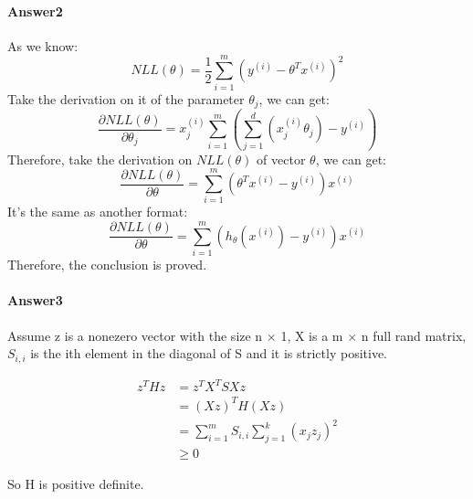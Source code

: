 \documentclass[paper=a4, fontsize=11pt]{scrartcl} %
\numberwithin{equation}{section} %
\numberwithin{figure}{section} %
\numberwithin{table}{section} %
\begin{document}
\paragraph{\textbf{Answer2}}
As we know:
\begin{equation*}
NLL\left ( \theta  \right )=\frac{1}{2}\sum_{i=1}^{m}\left ( y^{\left ( i \right )}-\theta ^{T}x^{\left ( i \right )} \right )^{2}
\end{equation*}
Take the derivation on it of the parameter $\theta_{j}$, we can get:
\begin{equation*}
\frac{\partial NLL\left ( \theta  \right ) }{\partial \theta _{j}}=x_{j}^{\left ( i \right )}\sum_{i=1}^{m}\left ( \sum_{j=1}^{d} \left (x_{j}^{\left ( i \right )}\theta _{j}\right) -y^{\left ( i \right )} \right )
\end{equation*}
Therefore, take the derivation on $NLL\left ( \theta  \right )$ of vector $\theta$, we can get:
\begin{equation*}
\frac{\partial NLL\left ( \theta  \right ) }{\partial \theta }=\sum_{i=1}^{m}\left ( \theta ^{T}x^{\left ( i \right )} -y^{\left ( i \right )} \right )x^{\left ( i \right )}
\end{equation*}
It's the same as another format:
\begin{equation*}
\frac{\partial NLL\left ( \theta  \right ) }{\partial \theta }=\sum_{i=1}^{m}\left ( h_{\theta }\left ( x^{\left ( i \right )} \right ) -y^{\left ( i \right )} \right )x^{\left ( i \right )}
\end{equation*}
Therefore, the conclusion is proved.

\paragraph{\textbf{Answer3}}
Assume z is a nonezero vector with the size n $\times$ 1, X is a m $\times$ n full rand matrix, $S_{i, i}$ is the ith element in the diagonal of S and it is strictly positive.

\begin{equation*}
\begin{aligned}
z^{T}Hz &= z^{T}X^{T}SXz \\ &= (Xz)^{T}H(Xz) \\ &=\sum_{i=1}^{m}S_{i,i}\sum_{j=1}^{k}(x_{j}z_{j})^{2}\\&\geq 0
\end{aligned}
\end{equation*}

So H is positive definite.
\end{document}
